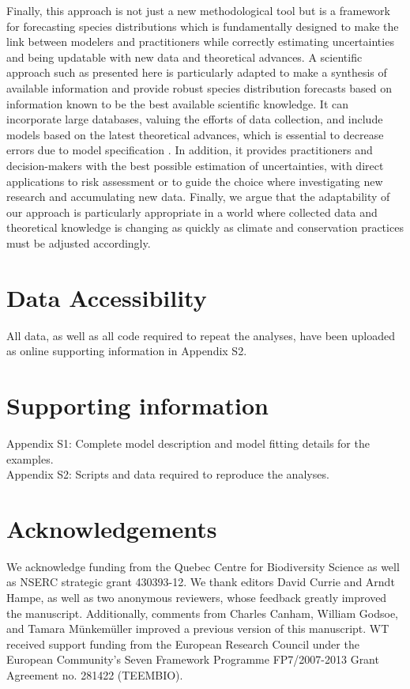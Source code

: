 \documentclass[11pt]{article}
\begin{document}
Finally, this approach is not just a new methodological tool but is a framework for forecasting species distributions which is fundamentally designed to make the link between modelers and practitioners while correctly estimating uncertainties and being updatable with new data and theoretical advances. 
A scientific approach such as presented here is particularly adapted to make a synthesis of available information and provide robust species distribution forecasts based on information known to be the best available scientific knowledge. 
It can incorporate large databases, valuing the efforts of data collection, and include models based on the latest theoretical advances, which is essential to decrease errors due to model specification \citep{Austin2007}. 
In addition, it provides practitioners and decision-makers with the best possible estimation of uncertainties, with direct applications to risk assessment or to guide the choice where investigating new research and accumulating new data. 
Finally, we argue that the adaptability of our approach is particularly appropriate in a world where collected data and theoretical knowledge is changing as quickly as climate and conservation practices must be adjusted accordingly.

\section*{Data Accessibility}
All data, as well as all code required to repeat the analyses, have been uploaded as online supporting information in Appendix S2.


%
%
\section*{Supporting information}
Appendix S1: Complete model description and model fitting details for the examples. \\
Appendix S2: Scripts and data required to reproduce the analyses.

\section*{Acknowledgements}
We acknowledge funding from the Quebec Centre for Biodiversity Science as well as NSERC strategic grant 430393-12. We thank editors David Currie and Arndt Hampe, as well as two anonymous reviewers, whose feedback greatly improved the manuscript. Additionally, comments from Charles Canham, William Godsoe, and Tamara Münkemüller improved a previous version of this manuscript. WT received support funding from the European Research Council under the European Community's Seven Framework Programme FP7/2007-2013 Grant Agreement no. 281422 (TEEMBIO). 
\end{document}
